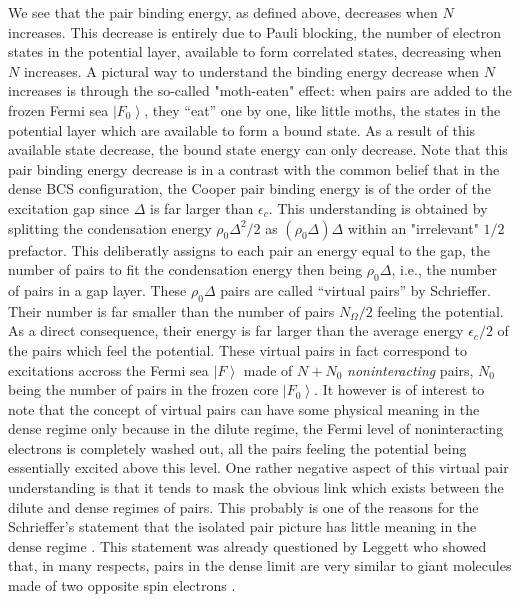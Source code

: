 \documentclass[aps,prb,superscriptaddress,twocolumn]{revtex4}
\begin{document}
We see that the pair binding energy, as defined
above, decreases when $N$ increases. This decrease is entirely due to
Pauli blocking, the number of electron states in
the potential layer, available to form correlated states, decreasing when $N$ increases. 
A pictural way to
understand the binding energy decrease when $N$ increases is through the
so-called "moth-eaten" effect: when pairs are added to the frozen Fermi sea $\left\vert
F_{0}\right\rangle $, they ``eat'' one by one, like little moths, the
states in the potential layer which are available to form a bound state. As
a result of this available state decrease, the bound state energy can only
decrease. Note that this pair binding energy decrease is in a contrast with
the common belief that in the dense BCS configuration, the Cooper pair
binding energy is of the order of the excitation gap since  $\Delta $ is far larger
than $\epsilon _{c}$. This understanding is obtained by splitting the
condensation energy $\rho _{0}\Delta ^{2}/2$ as $(\rho _{0}\Delta )\Delta $
within an "irrelevant" $1/2$ prefactor. This deliberatly assigns to each pair an
energy equal to the gap, the number of pairs to fit the condensation energy
then being $\rho _{0}\Delta $, i.e., the number of pairs in a gap layer. These $\rho
_{0}\Delta $ pairs are called ``virtual pairs'' by Schrieffer.
Their number is far smaller than the number of pairs $N_{\Omega }/2$ feeling
the potential. As a direct consequence, their energy is far larger than the average energy $%
\epsilon _{c}/2$ of the pairs which feel the potential. These virtual pairs in fact correspond
to excitations accross the Fermi sea $\left\vert F\right\rangle $ made of $%
N+N_{0}$ \textit{noninteracting} pairs, $N_{0}$ being the number of pairs in
the frozen core $\left\vert F_{0}\right\rangle $. It however is of interest to note that the concept of virtual
pairs can have some physical meaning in the dense regime only because in the
dilute regime, the Fermi level of noninteracting electrons is completely
washed out, all the pairs feeling the potential being essentially excited above this level.
One rather negative aspect of this virtual pair understanding is that it tends to 
mask the obvious link which exists between the dilute and dense regimes of pairs. 
This probably is one of the reasons for the Schrieffer's statement that the
isolated pair picture has little meaning in the dense regime
\cite{Schrieffer}. This statement was already questioned by Leggett who
showed that, in many respects, pairs in the dense limit are very similar to giant molecules made of two opposite spin electrons \cite{LeggettCrossover}. 
\end{document}
